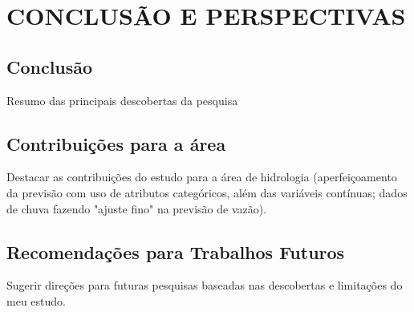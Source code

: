 \chapter{CONCLUS\~AO E PERSPECTIVAS}
\section{Conclus\~ao}
Resumo das principais descobertas da pesquisa

\section{Contribuiç\~oes para a área}
Destacar as contribuições do estudo para a área de hidrologia (aperfeiçoamento da previsão com uso de atributos categóricos, além das variáveis contínuas; dados de chuva fazendo "ajuste fino" na previsão de vazão).

\section{Recomendações para Trabalhos Futuros}
Sugerir direções para futuras pesquisas baseadas nas descobertas e limitações do meu estudo.